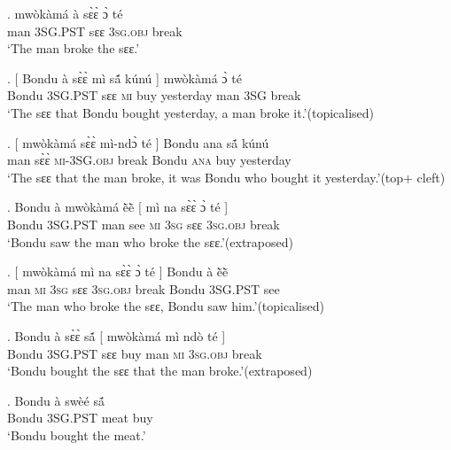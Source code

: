 \documentclass{assets/fieldnotes}
\begin{document}
{\exg. mwòkàmá à sɛ̀ɛ̀ ɔ̀ té\\
man \textsc{3SG.PST} sɛɛ \textsc{3sg.obj} break\\
`The man broke the sɛɛ.’

\exg. {[} Bondu à sɛ̀ɛ̀ mì sã́ kúnú {]} mwòkàmá ɔ̀ té\\
{} Bondu \textsc{3SG.PST} sɛɛ \textsc{mi} buy yesterday {} man \textsc{3SG} break\\
`The sɛɛ that Bondu bought yesterday, a man broke it.’\hfill{(topicalised)}\label{man_broke_bondu_bought_topicalised}

\exg. {[} mwòkàmá sɛ̀ɛ̀ mì-ndɔ̀ té {]} Bondu ana sã́ kúnú\\
{} man sɛ̀ɛ̀ \textsc{mi}-\textsc{3SG.obj} break {} Bondu \textsc{ana} buy yesterday\\
`The sɛɛ that the man broke, it was Bondu who bought it yesterday.’\hfill{(top+ cleft)}\label{man_broke_bondu_bought_cleft}

\exg. Bondu à mwòkàmá ẽ̀ẽ̀ {[} mì na sɛ̀ɛ̀ ɔ̀ té {]}\\
Bondu \textsc{3SG.PST} man see {} \textsc{mi} \textsc{3sg} sɛɛ \textsc{3sg.obj} break {}\\
`Bondu saw the man who broke the sɛɛ.’\hfill{(extraposed)}\label{bondu_see_man_break_extraposed}

\exg. {[} mwòkàmá mì na sɛ̀ɛ̀ ɔ̀ té {]} Bondu à ẽ̀ẽ̀\\
{} man \textsc{mi} \textsc{3sg} sɛɛ \textsc{3sg.obj} break {} Bondu \textsc{3SG.PST} see\\
`The man who broke the sɛɛ, Bondu saw him.’\hfill{(topicalised)}\label{bondu_see_man_break_topicalised}\\


\exg. Bondu à sɛ̀ɛ̀ sã́ {[} mwòkàmá mì ndò té {]}\\
Bondu \textsc{3SG.PST} sɛɛ buy {} man \textsc{mi} \textsc{3sg.obj} break {}\\
`Bondu bought the sɛɛ that the man broke.'\hfill{(extraposed)}\label{bondu_bought_man_break_extraposed}

\noindent{\rule{\textwidth}{1pt}}

\exg. Bondu à swèé sã́\\
Bondu \textsc{3SG.PST} meat buy\\
`Bondu bought the meat.'

}
\end{document}
